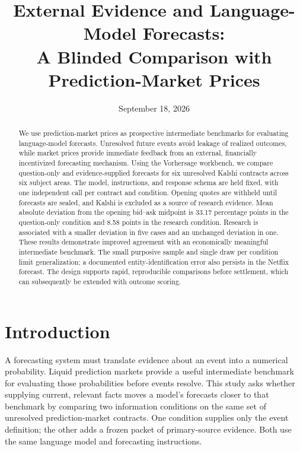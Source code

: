 \documentclass[11pt,letterpaper]{article}
\title{External Evidence and Language-Model Forecasts:\\
A Blinded Comparison with Prediction-Market Prices}
\author{}
\date{September 18, 2026}
\begin{document}
\maketitle
\begin{abstract}
We use prediction-market prices as prospective intermediate benchmarks for
evaluating language-model forecasts. Unresolved future events avoid leakage
of realized outcomes, while market prices provide immediate feedback from an
external, financially incentivized forecasting mechanism. Using the Vorhersage
workbench, we compare question-only and evidence-supplied forecasts for six
unresolved Kalshi contracts across six subject areas. The model, instructions,
and response schema are held fixed, with one independent call per contract
and condition. Opening quotes are withheld until forecasts are sealed, and
Kalshi is excluded as a source of research evidence. Mean absolute deviation
from the opening bid--ask midpoint is
33.17 percentage points in the question-only condition and 8.58 points in the
research condition. Research is associated with a smaller deviation in five
cases and an unchanged deviation in one. These results demonstrate improved
agreement with an economically meaningful intermediate benchmark. The small
purposive sample and single draw per condition limit generalization; a
documented entity-identification error also persists in the Netflix forecast.
The design supports rapid, reproducible comparisons before settlement, which
can subsequently be extended with outcome scoring.
\end{abstract}

\section{Introduction}
A forecasting system must translate evidence about an event into a numerical
probability. Liquid prediction markets provide a useful intermediate benchmark
for evaluating those probabilities before events resolve. This study asks
whether supplying current, relevant facts moves a model's forecasts closer to
that benchmark by comparing two
information conditions on the same set of unresolved prediction-market
contracts. One condition supplies only the event definition; the other adds a
frozen packet of primary-source evidence. Both use the same language model and
forecasting instructions.
\end{document}
